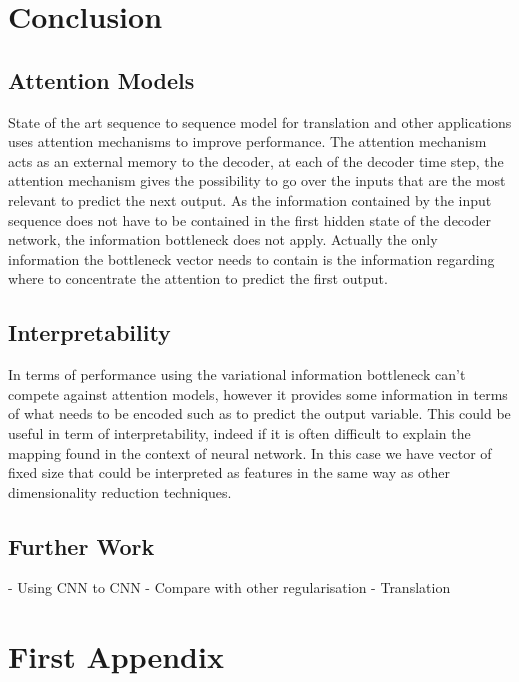 \documentclass[10pt,oneside,openright]{report}
\begin{document}
\chapter{Conclusion}
\section{Attention Models}
State of the art sequence to sequence model for translation and other applications uses attention mechanisms to improve performance. The attention mechanism acts as an external memory to the decoder, at each of the decoder time step, the attention mechanism gives the possibility to go over the inputs that are the most relevant to predict the next output. As the information contained by the input sequence does not have to be contained in the first hidden state of the decoder network, the information bottleneck does not apply. Actually the only information the bottleneck vector needs to contain is the information regarding where to concentrate the attention to predict the first output. 

\section{Interpretability}
In terms of performance using the variational information bottleneck can't compete against attention models, however it provides some information in terms of what needs to be encoded such as to predict the output variable. This could be useful in term of interpretability, indeed if it is often difficult to explain the mapping found in the context of neural network. In this case we have vector of fixed size that could be interpreted as features in the same way as other dimensionality reduction techniques.

\section{Further Work}
- Using CNN to CNN
- Compare with other regularisation
- Translation

\appendix
\chapter{First Appendix}
\end{document}
